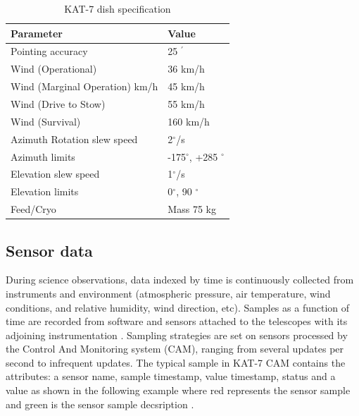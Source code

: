 \begin{table}[H]\centering
\begin{tabular}{l l }
\toprule
\textbf{Parameter} & \textbf{Value}\\
\midrule
Pointing accuracy & 25 $^{\prime}$ \\
Wind (Operational) & 36 km/h\\
Wind (Marginal Operation) km/h & 45 km/h\\
Wind (Drive to Stow) & 55 km/h\\
Wind (Survival) & 160 km/h\\
Azimuth Rotation slew speed &  2$^\circ$/s\\
Azimuth limits & -175$^{\circ}$, +285 $^{\circ}$\\
Elevation slew speed & 1$^{\circ}$/s\\
Elevation limits & 0$^{\circ}$, 90 $^{\circ}$\\
Feed/Cryo & Mass 75 kg\\
\bottomrule
\end{tabular}
\caption{KAT-7 dish specification \citep{foley2016engineering}}
\label{DSpec}
\end{table}

\subsection{Sensor data}


During science observations, data indexed by time is continuously collected from instruments and  environment (atmospheric pressure, air temperature,  wind conditions, and relative humidity, wind direction, etc). Samples as a function of time are recorded from software and sensors attached to the telescopes with its adjoining instrumentation \citep{slabberICALEPCS2017}. Sampling strategies are set on sensors processed by the Control And Monitoring system (CAM), ranging from several updates per second to infrequent updates. The typical sample in KAT-7 CAM contains the attributes: a sensor name, sample timestamp, value timestamp, status and a value as shown in the following example where red represents the sensor sample and green is the sensor sample decsription \citep{slabber2015overview}. 

 

